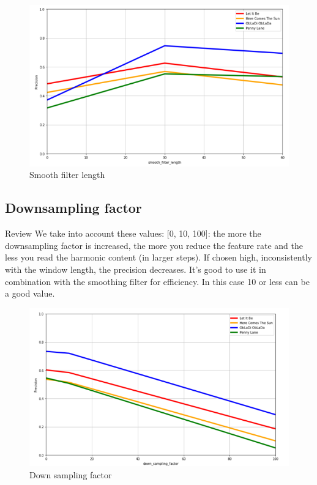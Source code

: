 \documentclass[
	12pt, %
]{fphw}
\begin{document}
{\begin{figure}[H]
 \centering
 \includegraphics[scale=1]{./images/5_smooth_precision.png}
 \caption{Smooth filter length}
\end{figure}

\subsection*{Downsampling factor}
\color{red}Review\color{black}
We take into account these values: [0, 10, 100]: the more the downsampling factor is increased, the more you reduce the feature rate and the less you read the harmonic content (in larger steps). If chosen high, inconsistently with the window length, the precision decreases.
It's good to use it in combination with the smoothing filter for efficiency. In this case 10 or less can be a good value.  

\begin{figure}[H]
 \centering
 \includegraphics[scale=1]{./images/5_down_sampling_precision.png}
 \caption{Down sampling factor}
\end{figure}

}
\end{document}
